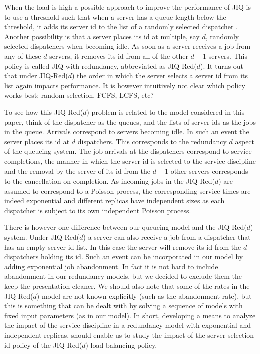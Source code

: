 \documentclass[acmsmall,nonacm]{acmart}
\begin{document}
When the load is high a possible approach to improve the performance of JIQ is to use a threshold such that when a
server has a queue length below the threshold, it adds its server id to the list of a randomly selected dispatcher \cite{mitzenmacherJIQ}.
Another possibility \cite{Harte} is that a server places its id at multiple, say $d$, randomly selected 
dispatchers when becoming idle. As soon as a server receives a job from any of these $d$ servers, it removes its id from all of the
other $d-1$ servers. This policy is called JIQ with redundancy, abbreviated as JIQ-Red($d$). It turns out that
under JIQ-Red($d$) the order in which the server selects a server id from its list again impacts performance.
It is however intuitively not clear which policy works best: random selection, FCFS, LCFS, etc? 

To see how this JIQ-Red($d$) problem is related to the model considered in this paper, think of the 
dispatcher as the queues, and the lists of server ids as the jobs in the queue.
Arrivals correspond to servers becoming idle. In such an event the server places its id at $d$ dispatchers. This corresponds
to the redundancy $d$ aspect of the queueing system. The job arrivals at the dispatchers correspond to service completions,
the manner in which the server id is selected to the service discipline and the removal by the server of its id from
the $d-1$ other servers corresponds to the cancellation-on-completion. As incoming jobs in the JIQ-Red($d$) are assumed
to correspond to a Poisson process, the corresponding service times are indeed exponential and different replicas have
independent sizes as each dispatcher is subject to its own independent Poisson process. 

There is however one difference between our queueing model and the JIQ-Red($d$) system. Under JIQ-Red($d$) a server can
also receive a job from a dispatcher that has an empty server id list. In this case the server will remove its id from
the $d$ dispatchers holding its id. Such an event can be incorporated in our model by adding exponential job abandonment.
In fact it is not hard to include abandonment in our redundancy models, but we decided to exclude them the keep the
presentation cleaner. We should also note that some of the rates in the JIQ-Red($d$) model are not known explicitly
(such as the abandonment rate), but this is something that can be dealt with by solving a sequence of models with fixed input parameters (as in our model).
In short, developing a means to analyze the impact of the service discipline in a redundancy model with exponential and 
independent replicas, should enable us to study the impact of the server selection id policy of the JIQ-Red($d$)
load balancing policy. 
\end{document}
